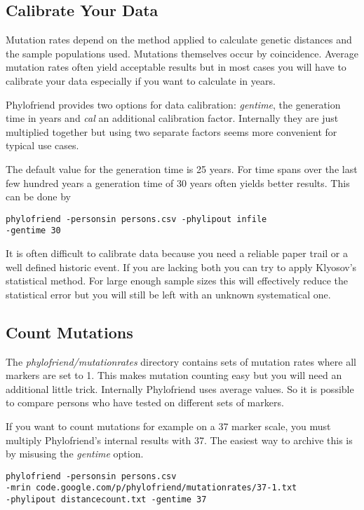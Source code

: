 \subsection{Calibrate Your Data}

Mutation rates depend on the method applied to calculate
genetic distances and the sample populations used. Mutations
themselves occur by coincidence. Average mutation rates
often yield acceptable results but in most cases you will
have to calibrate your data especially if you want to
calculate in years.

Phylofriend provides two options for data calibration:
\emph{gentime}, the generation time in years and
\emph{cal} an additional calibration factor. Internally
they are just multiplied together but using two separate
factors seems more convenient for typical use cases.

The default value for the generation time is 25 years.
For time spans over the last few hundred years a generation
time of 30 years often yields better results. This can
be done by

\noindent\texttt{phylofriend -personsin persons.csv -phylipout infile\\
-gentime 30}

It is often difficult to calibrate data because you need a
reliable paper trail or a well defined historic event. If
you are lacking both you can try to apply Klyosov's statistical
method\cite{Kly09}. For large enough sample sizes this will
effectively reduce the statistical error but you will still
be left with an unknown systematical one.


\subsection{Count Mutations}

The \emph{phylofriend/mutationrates} directory contains
sets of mutation rates where all markers are set to 1.
This makes mutation counting easy but you will need an
additional little trick. Internally Phylofriend uses
average values. So it is possible to compare persons who
have tested on different sets of markers.

If you want to count mutations for example on a 37 marker
scale, you must multiply Phylofriend's internal results with
37. The easiest way to archive this is by misusing the
\emph{gentime} option. 

\noindent\texttt{phylofriend -personsin persons.csv\\
-mrin code.google.com/p/phylofriend/mutationrates/37-1.txt\\
-phylipout distancecount.txt -gentime 37}


